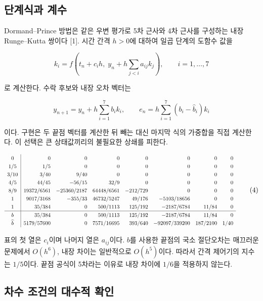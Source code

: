 \documentclass[
  10pt,
  dvipsnames]{article}
\begin{document}
\hypertarget{uxb2e8uxacc4uxc2dduxacfc-uxacc4uxc218}{%
\subsection{단계식과 계수}\label{uxb2e8uxacc4uxc2dduxacfc-uxacc4uxc218}}

Dormand--Prince 방법은 같은 우변 평가로 5차 근사와 4차 근사를 구성하는
내장 Runge--Kutta 쌍이다 {[}1{]}. 시간 간격 \(h>0\)에 대하여 일곱 단계의
도함수 값을

\[
 k_i=f\!\left(t_n+c_i h,\;y_n+h\sum_{j<i}a_{ij}k_j\right),
 \qquad i=1,\ldots,7
 \tag{2}
\]

로 계산한다. 수락 후보와 내장 오차 벡터는

\[
 y_{n+1}=y_n+h\sum_{i=1}^7 b_i k_i,\qquad
 e_n=h\sum_{i=1}^7(b_i-\widehat b_i)k_i
 \tag{3}
\]

이다. 구현은 두 끝점 벡터를 계산한 뒤 빼는 대신 마지막 식의 가중합을
직접 계산한다. 이 선택은 큰 상태값끼리의 불필요한 상쇄를 피한다.

\begin{equation}\resizebox{0.98\textwidth}{!}{$\renewcommand{\arraystretch}{1.25}
\begin{array}{c|rrrrrrr}
0&0&0&0&0&0&0&0\\
1/5&1/5&0&0&0&0&0&0\\
3/10&3/40&9/40&0&0&0&0&0\\
4/5&44/45&-56/15&32/9&0&0&0&0\\
8/9&19372/6561&-25360/2187&64448/6561&-212/729&0&0&0\\
1&9017/3168&-355/33&46732/5247&49/176&-5103/18656&0&0\\
1&35/384&0&500/1113&125/192&-2187/6784&11/84&0\\\hline
b&35/384&0&500/1113&125/192&-2187/6784&11/84&0\\
\widehat b&5179/57600&0&7571/16695&393/640&-92097/339200&187/2100&1/40
\end{array}$}\tag{4}\end{equation}

표의 첫 열은 \(c_i\)이며 나머지 열은 \(a_{ij}\)이다. \(b\)를 사용한
끝점의 국소 절단오차는 매끄러운 문제에서 \(O(h^6)\), 내장 차이는
일반적으로 \(O(h^5)\)이다. 따라서 간격 제어기의 지수는 \(1/5\)이다. 끝점
공식이 5차라는 이유로 내장 차이에 \(1/6\)을 적용하지 않는다.

\hypertarget{uxcc28uxc218-uxc870uxac74uxc758-uxb300uxc218uxc801-uxd655uxc778}{%
\subsection{차수 조건의 대수적
확인}\label{uxcc28uxc218-uxc870uxac74uxc758-uxb300uxc218uxc801-uxd655uxc778}}
\end{document}
